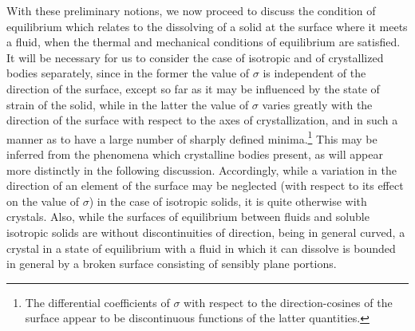 \documentclass[12pt]{memoir}
\begin{document}
With these preliminary notions, we now proceed to discuss the condition of equilibrium which relates to the dissolving of a solid at the surface where it meets a fluid, when the thermal and mechanical conditions of equilibrium are satisfied. It will be necessary for us to consider the case of isotropic and of crystallized bodies separately, since in the former the value of $\sigma$ is independent of the direction of the surface, except so far as it may be influenced by the state of strain of the solid, while in the latter the value of $\sigma$ varies greatly with the direction of the surface with respect to the axes of crystallization, and in such a manner as to have a large number of sharply defined minima.\footnote{The differential coefficients of $\sigma$ with respect to the direction-cosines of the surface appear to be discontinuous functions of the latter quantities.} This may be inferred from the phenomena which crystalline bodies present, as will appear more distinctly in the following discussion. Accordingly, while a variation in the direction of an element of the surface may be neglected (with respect to its effect on the value of $\sigma$) in the case of isotropic solids, it is quite otherwise with crystals. Also, while the surfaces of equilibrium between fluids and soluble isotropic solids are without discontinuities of direction, being in general curved, a crystal in a state of equilibrium with a fluid in which it can dissolve is bounded in general by a broken surface consisting of sensibly plane portions.
\end{document}
